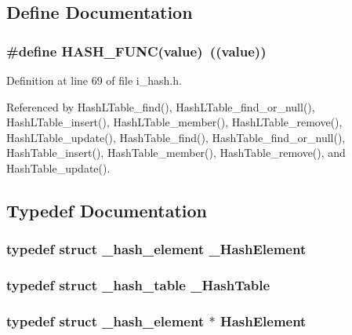 \subsection{Define Documentation}
\subsubsection{\setlength{\rightskip}{0pt plus 5cm}\#define HASH\_\-FUNC(value)~((value))}\label{i__hash_8h_1f7757c96b9baa1fca3f60bb748db721}




Definition at line 69 of file i\_\-hash.h.

Referenced by Hash\-LTable\_\-find(), Hash\-LTable\_\-find\_\-or\_\-null(), Hash\-LTable\_\-insert(), Hash\-LTable\_\-member(), Hash\-LTable\_\-remove(), Hash\-LTable\_\-update(), Hash\-Table\_\-find(), Hash\-Table\_\-find\_\-or\_\-null(), Hash\-Table\_\-insert(), Hash\-Table\_\-member(), Hash\-Table\_\-remove(), and Hash\-Table\_\-update().

\subsection{Typedef Documentation}
\subsubsection{\setlength{\rightskip}{0pt plus 5cm}typedef struct \bf{\_\-hash\_\-element}  \bf{\_\-Hash\-Element}}\label{i__hash_8h_3970b62d8d2018d7b54379fa0aec5e05}


\subsubsection{\setlength{\rightskip}{0pt plus 5cm}typedef struct \bf{\_\-hash\_\-table}  \bf{\_\-Hash\-Table}}\label{i__hash_8h_44724f967853c0322673f43ca88b9ad5}


\subsubsection{\setlength{\rightskip}{0pt plus 5cm}typedef struct \bf{\_\-hash\_\-element} $\ast$ \bf{Hash\-Element}}\label{i__hash_8h_ced144adc68a07662fc4739c8b7bf479}


